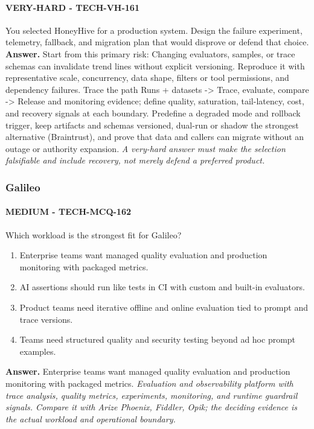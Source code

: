 \paragraph{VERY-HARD - TECH-VH-161} You selected HoneyHive for a production system. Design the failure experiment, telemetry, fallback, and migration plan that would disprove or defend that choice.
\textbf{Answer.} Start from this primary risk: Changing evaluators, samples, or trace schemas can invalidate trend lines without explicit versioning. Reproduce it with representative scale, concurrency, data shape, filters or tool permissions, and dependency failures. Trace the path Runs + datasets -> Trace, evaluate, compare -> Release and monitoring evidence; define quality, saturation, tail-latency, cost, and recovery signals at each boundary. Predefine a degraded mode and rollback trigger, keep artifacts and schemas versioned, dual-run or shadow the strongest alternative (Braintrust), and prove that data and callers can migrate without an outage or authority expansion.
\textit{A very-hard answer must make the selection falsifiable and include recovery, not merely defend a preferred product.}
\subsubsection*{Galileo}
\paragraph{MEDIUM - TECH-MCQ-162} Which workload is the strongest fit for Galileo?
\begin{enumerate}[label=\Alph*.]
\item Enterprise teams want managed quality evaluation and production monitoring with packaged metrics.
\item AI assertions should run like tests in CI with custom and built-in evaluators.
\item Product teams need iterative offline and online evaluation tied to prompt and trace versions.
\item Teams need structured quality and security testing beyond ad hoc prompt examples.
\end{enumerate}
\textbf{Answer.} Enterprise teams want managed quality evaluation and production monitoring with packaged metrics.
\textit{Evaluation and observability platform with trace analysis, quality metrics, experiments, monitoring, and runtime guardrail signals. Compare it with Arize Phoenix, Fiddler, Opik; the deciding evidence is the actual workload and operational boundary.}
